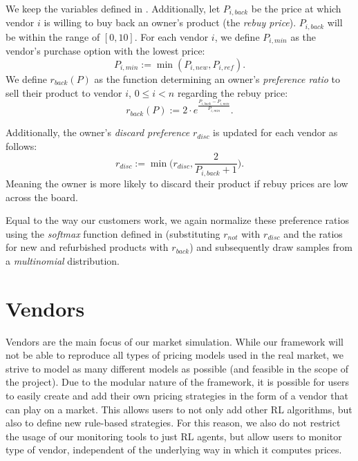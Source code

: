 \begin{definition}\label{def:ownerDecisions}
	We keep the variables defined in . Additionally, let \(P_{i,back}\) be the price at which vendor \(i\) is willing to buy back an owner's product (the \emph{rebuy price}). \(P_{i, back}\) will be within the range of \([0,10]\). For each vendor \(i\), we define \(P_{i,min}\) as the vendor's purchase option with the lowest price:
	\begin{equation}
		P_{i, min} := \min(P_{i, new}, P_{i, ref}).
	\end{equation}
	We define \(r_{back}(P)\) as the function determining an owner's \emph{preference ratio} to sell their product to vendor \(i\), \(0 \leq i < n\) regarding the rebuy price:
	\begin{equation}
		r_{back}(P) := 2 \cdot e^{\frac{P_{i, back} - P_{i, min}}{P_{i, min}}}.
	\end{equation}

	\pagebreak

	\noindent Additionally, the owner's \emph{discard preference} \(r_{disc}\) is updated for each vendor as follows:
	\begin{equation}
		r_{disc} := \min\biggl({r_{disc}, \frac{2}{P_{i, back} + 1}}\biggr).
	\end{equation}
	Meaning the owner is more likely to discard their product if rebuy prices are low across the board.
\end{definition}

Equal to the way our customers work, we again normalize these preference ratios using the \emph{softmax} function defined in  (substituting \(r_{not}\) with \(r_{disc}\) and the ratios for new and refurbished products with \(r_{back}\)) and subsequently draw samples from a \emph{multinomial} distribution.

\section{Vendors}\label{sec:ExplainVendors}

Vendors are the main focus of our market simulation. While our framework will not be able to reproduce all types of pricing models used in the real market, we strive to model as many different models as possible (and feasible in the scope of the project). Due to the modular nature of the framework, it is possible for users to easily create and add their own pricing strategies in the form of a vendor that can play on a market. This allows users to not only add other RL algorithms, but also to define new rule-based strategies. For this reason, we also do not restrict the usage of our monitoring tools to just RL agents, but allow users to monitor type of vendor, independent of the underlying way in which it computes prices.

